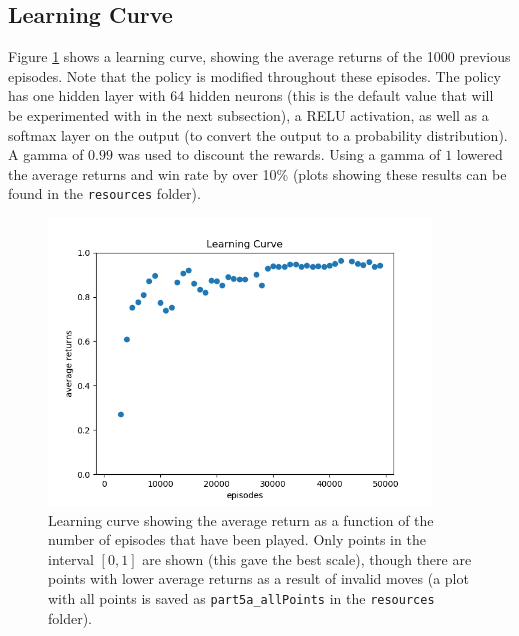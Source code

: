 \documentclass{article}
\begin{document}
   \subsection{Learning Curve}
   Figure \ref{fig:5a} shows a learning curve, showing the average returns of the 1000 previous episodes. Note
   that the policy is modified throughout these episodes. The policy has one hidden layer with 64 hidden neurons
   (this is the default value that will be experimented with in the next subsection), a RELU activation, as well
   as a softmax layer on the output (to convert the output to a probability distribution). A gamma of $0.99$ was used
   to discount the rewards. Using a gamma of $1$ lowered the average returns and win rate by over 10\% (plots showing
   these results can be found in the \texttt{resources} folder).
      \begin{figure}[h] \centering
          \includegraphics[width=4in]{resources/part5a_scaled}
          \caption{ Learning curve showing the average return as a function of the number of episodes
                  that have been played. Only points in the interval $[0,1]$ are shown (this gave the best scale),
                  though there are points with lower average returns as a result of invalid moves (a plot with all
                  points is saved as \texttt{part5a\_allPoints} in the \texttt{resources} folder). }
          \label{fig:5a}
       \end{figure}
\end{document}
